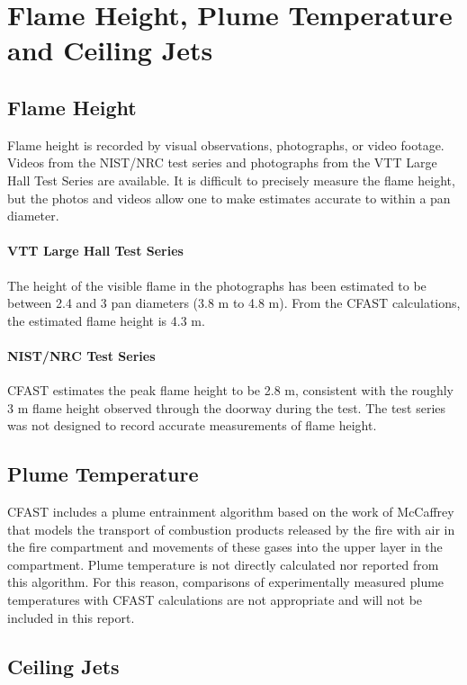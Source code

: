 \chapter{Flame Height, Plume Temperature and Ceiling Jets}

\section{Flame Height}

Flame height is recorded by visual observations, photographs, or video footage.  Videos from the NIST/NRC test series and photographs from the VTT Large Hall Test Series are available.  It is difficult to precisely measure the flame height, but the photos and videos allow one to make estimates accurate to within a pan diameter.

\subsubsection{VTT Large Hall Test Series}

The height of the visible flame in the photographs has been estimated to be between 2.4 and 3 pan diameters (3.8 m to 4.8 m).  From the CFAST calculations, the estimated flame height is 4.3 m.

\subsubsection{NIST/NRC Test Series}

CFAST estimates the peak flame height to be 2.8 m, consistent with the roughly 3 m flame height observed through the doorway during the test.  The test series was not designed to record accurate measurements of flame height.

\section{Plume Temperature}

CFAST includes a plume entrainment algorithm based on the work of McCaffrey that models the transport of combustion products released by the fire with air in the fire compartment and movements of these gases into the upper layer in the compartment.  Plume temperature is not directly calculated nor reported from this algorithm.  For this reason, comparisons of experimentally measured plume temperatures with CFAST calculations are not appropriate and will not be included in this report.

\section{Ceiling Jets}

